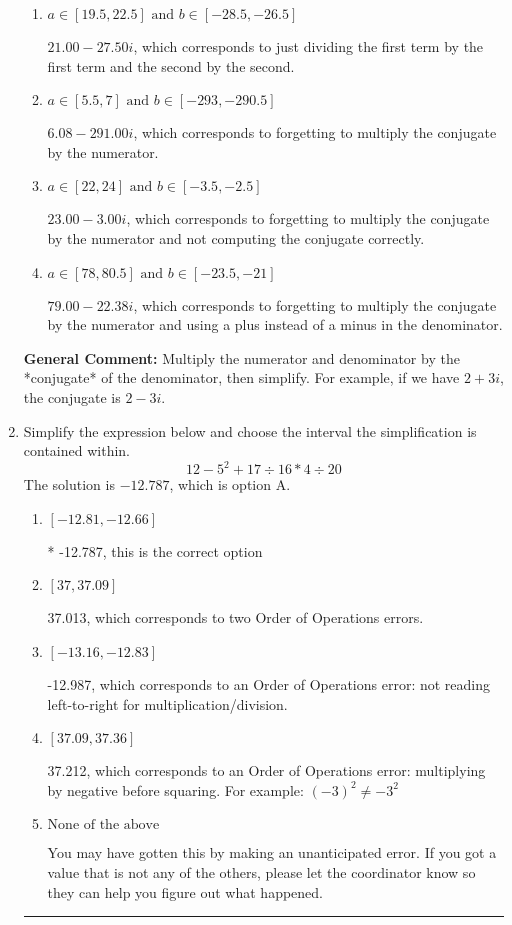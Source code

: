 \documentclass{extbook}[14pt]
\newcommand{\litem}[1]{\item #1

\rule{\textwidth}{0.4pt}}
\begin{document}
\begin{enumerate}
{\begin{enumerate}[label=\Alph*.]
* $6.08  - 22.38 i$, which is the correct option.
\item \( a \in [19.5, 22.5] \text{ and } b \in [-28.5, -26.5] \)

 $21.00  - 27.50 i$, which corresponds to just dividing the first term by the first term and the second by the second.
\item \( a \in [5.5, 7] \text{ and } b \in [-293, -290.5] \)

 $6.08  - 291.00 i$, which corresponds to forgetting to multiply the conjugate by the numerator.
\item \( a \in [22, 24] \text{ and } b \in [-3.5, -2.5] \)

 $23.00  - 3.00 i$, which corresponds to forgetting to multiply the conjugate by the numerator and not computing the conjugate correctly.
\item \( a \in [78, 80.5] \text{ and } b \in [-23.5, -21] \)

 $79.00  - 22.38 i$, which corresponds to forgetting to multiply the conjugate by the numerator and using a plus instead of a minus in the denominator.
\end{enumerate}

\textbf{General Comment:} Multiply the numerator and denominator by the *conjugate* of the denominator, then simplify. For example, if we have $2+3i$, the conjugate is $2-3i$.
}
\litem{
Simplify the expression below and choose the interval the simplification is contained within.
\[ 12 - 5^2 + 17 \div 16 * 4 \div 20 \]The solution is \( -12.787 \), which is option A.\begin{enumerate}[label=\Alph*.]
\item \( [-12.81, -12.66] \)

* -12.787, this is the correct option
\item \( [37, 37.09] \)

 37.013, which corresponds to two Order of Operations errors.
\item \( [-13.16, -12.83] \)

 -12.987, which corresponds to an Order of Operations error: not reading left-to-right for multiplication/division.
\item \( [37.09, 37.36] \)

 37.212, which corresponds to an Order of Operations error: multiplying by negative before squaring. For example: $(-3)^2 \neq -3^2$
\item \( \text{None of the above} \)

 You may have gotten this by making an unanticipated error. If you got a value that is not any of the others, please let the coordinator know so they can help you figure out what happened.
\end{enumerate}

}
\end{enumerate}
\end{document}
